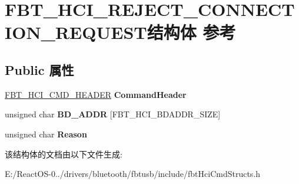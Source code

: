 \hypertarget{struct_f_b_t___h_c_i___r_e_j_e_c_t___c_o_n_n_e_c_t_i_o_n___r_e_q_u_e_s_t}{}\section{F\+B\+T\+\_\+\+H\+C\+I\+\_\+\+R\+E\+J\+E\+C\+T\+\_\+\+C\+O\+N\+N\+E\+C\+T\+I\+O\+N\+\_\+\+R\+E\+Q\+U\+E\+S\+T结构体 参考}
\label{struct_f_b_t___h_c_i___r_e_j_e_c_t___c_o_n_n_e_c_t_i_o_n___r_e_q_u_e_s_t}
\subsection*{Public 属性}
\begin{DoxyCompactItemize}
\item 
\mbox{\label{struct_f_b_t___h_c_i___r_e_j_e_c_t___c_o_n_n_e_c_t_i_o_n___r_e_q_u_e_s_t_a55f7924b56f3e232777e2cd50988674d}} 
\hyperlink{struct_f_b_t___h_c_i___c_m_d___h_e_a_d_e_r}{F\+B\+T\+\_\+\+H\+C\+I\+\_\+\+C\+M\+D\+\_\+\+H\+E\+A\+D\+ER} {\bfseries Command\+Header}
\item 
\mbox{\label{struct_f_b_t___h_c_i___r_e_j_e_c_t___c_o_n_n_e_c_t_i_o_n___r_e_q_u_e_s_t_a2557ad3c43af9e7fbf7249e90422d401}} 
unsigned char {\bfseries B\+D\+\_\+\+A\+D\+DR} \mbox{[}F\+B\+T\+\_\+\+H\+C\+I\+\_\+\+B\+D\+A\+D\+D\+R\+\_\+\+S\+I\+ZE\mbox{]}
\item 
\mbox{\label{struct_f_b_t___h_c_i___r_e_j_e_c_t___c_o_n_n_e_c_t_i_o_n___r_e_q_u_e_s_t_a4473cab96a845640e374a101666eb0da}} 
unsigned char {\bfseries Reason}
\end{DoxyCompactItemize}


该结构体的文档由以下文件生成\+:\begin{DoxyCompactItemize}
\item 
E\+:/\+React\+O\+S-\/0../drivers/bluetooth/fbtusb/include/fbt\+Hci\+Cmd\+Structs.\+h\end{DoxyCompactItemize}
